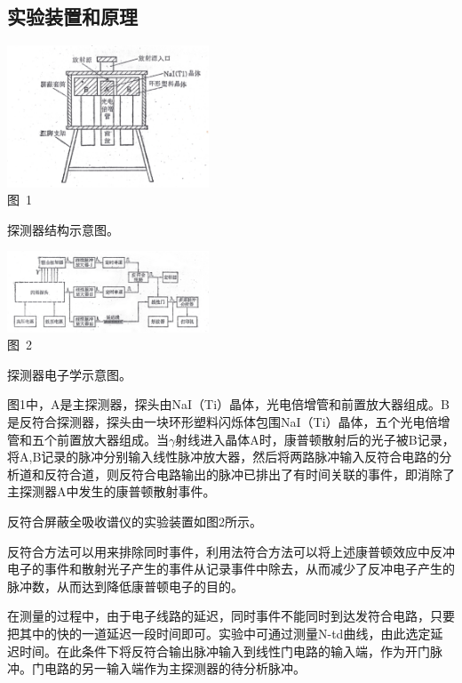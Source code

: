 \documentclass[a4paper,10.0pt,twoside]{npr}
\begin{document}
\begin{multicols}{2}
\section{实验装置和原理}
\begin{center}
   \includegraphics[width=0.45\textwidth]{yiqi.png}
\\
\xiaowu\song 图~1\begin{minipage}[t]{75mm} \quad 探测器结构示意图。\\[-1mm]\wuhao
\end{minipage}
\end{center}
\begin{center}
   \includegraphics[width=0.45\textwidth]{jiexian.png}
\\
\xiaowu\song 图~2\begin{minipage}[t]{75mm} \quad 探测器电子学示意图。\\[-1mm]\wuhao
\end{minipage}
\end{center}

图1中，A是主探测器，探头由NaI（Ti）晶体，光电倍增管和前置放大器组成。B是反符合探测器，探头由一块环形塑料闪烁体包围NaI（Ti）晶体，五个光电倍增管和五个前置放大器组成。当$\gamma$射线进入晶体A时，康普顿散射后的光子被B记录，将A,B记录的脉冲分别输入线性脉冲放大器，然后将两路脉冲输入反符合电路的分析道和反符合道，则反符合电路输出的脉冲已排出了有时间关联的事件，即消除了主探测器A中发生的康普顿散射事件。

反符合屏蔽全吸收谱仪的实验装置如图2所示。

反符合方法可以用来排除同时事件，利用法符合方法可以将上述康普顿效应中反冲电子的事件和散射光子产生的事件从记录事件中除去，从而减少了反冲电子产生的脉冲数，从而达到降低康普顿电子的目的。

在测量的过程中，由于电子线路的延迟，同时事件不能同时到达发符合电路，只要把其中的快的一道延迟一段时间即可。实验中可通过测量N-td曲线，由此选定延迟时间。在此条件下将反符合输出脉冲输入到线性门电路的输入端，作为开门脉冲。门电路的另一输入端作为主探测器的待分析脉冲。

\end{multicols}
\end{document}
